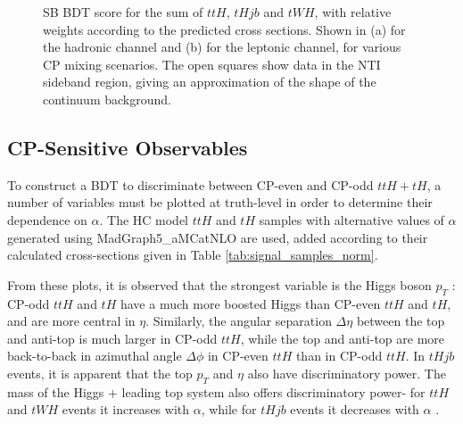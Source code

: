 \begin{figure}[htbp]
  \centering
  \caption{SB BDT score for the sum of $ttH$, $tHjb$ and $tWH$, with relative weights according to the predicted cross sections. Shown in (a) for the hadronic channel and (b) for the leptonic channel, for various CP mixing scenarios. The open squares show data in the NTI sideband region, giving an approximation of the shape of the continuum background.  }
  \label{fig:moriondtotal}
\end{figure}


\subsection{CP-Sensitive Observables}

To construct a BDT to discriminate between CP-even and CP-odd $ttH+tH$, a number of variables must be plotted at truth-level in order to determine their dependence on $\alpha$. The HC model $ttH$ and $tH$ samples with alternative values of $\alpha$ generated using MadGraph5\_aMCatNLO are used, added according to their calculated cross-sections given in Table \ref{tab:signal_samples_norm}.

From these plots, it is observed that the strongest variable is the Higgs boson $p_{T}$ : CP-odd $ttH$ and $tH$ have a much more boosted Higgs than CP-even $ttH$ and $tH$, and are more central in $\eta$. Similarly, the angular separation $\Delta \eta$ between the top and anti-top is much larger in CP-odd $ttH$, while the top and anti-top are more back-to-back in azimuthal angle $\Delta \phi$ in CP-even $ttH$ than in CP-odd $ttH$. In $tHjb$ events, it is apparent that the top $p_{T}$ and $\eta$ also have discriminatory power. The mass of the Higgs + leading top system also offers discriminatory power- for $ttH$ and $tWH$ events it increases with $\alpha$, while for $tHjb$ events it decreases with $\alpha$ .

